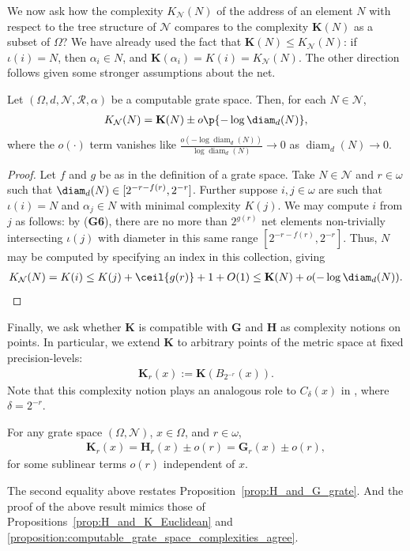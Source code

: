 We now ask how the complexity $K_{\mathcal{N}}(N)$ of the address of an element $N$ with respect to the tree structure of $\mathcal{N}$ compares to the complexity $\mathbf{K}(N)$ as a subset of $\Omega$? We have already used the fact that $\mathbf{K}(N) \leq 
K_{\mathcal{N}}(N)$: if $\iota(i) = N$, then $\alpha_i \in N$, and $\mathbf{K}(\alpha_i) = K(i) = K_{\mathcal{N}}(N)$. The other direction follows given some stronger assumptions about the net.

\begin{proposition}
    \label{proposition:computable_grate_space_complexities_agree}
    Let $(\Omega, d, \mathcal{N}, \mathscr{R}, \alpha)$ be a computable grate space. Then, for each $N \in \mathcal{N}$,
    \begin{align*}
        K_{\mathcal{N}}(N) = \mathbf{K}(N) \pm o\p{-\log \diam_d(N)},
    \end{align*}
    where the $o(\cdot)$ term vanishes like $\frac{o(-\log \operatorname{diam}_d(N))}{\log \operatorname{diam}_d(N)} \to 0$ as $\operatorname{diam}_d(N) \to 0$.
\end{proposition}
\begin{proof}
    Let $f$ and $g$ be as in the definition of a grate space. Take $N \in \mathcal{N}$ and $r \in \omega$ such that $\diam_d(N) \in [2^{-r - f(r)}, 2^{-r}]$. Further suppose $i, j \in \omega$ are such that $\iota(i) = N$ and $\alpha_j \in N$ with minimal complexity $K(j)$. We may compute $i$ from $j$ as follows: by (\textbf{G6}), there are no more than $2^{g(r)}$ net elements non-trivially intersecting $\iota(j)$ with diameter in this same range $[2^{-r - f(r)}, 2^{-r}]$. Thus, $N$ may be computed by specifying an index in this collection, giving
    \begin{align*}
        K_{\mathcal{N}}(N) = K(i) \leq K(j) + \ceil{g(r)} + 1 + O(1) \leq \mathbf{K}(N) + o(-\log \diam_d(N)).
    \end{align*}
\end{proof}

Finally, we ask whether $\mathbf{K}$ is compatible with $\mathbf{G}$ and $\mathbf{H}$ as complexity notions on points. In particular, we extend $\mathbf{K}$ to arbitrary points of the metric space at fixed precision-levels: 
\begin{align*}
    \mathbf{K}_r(x) := \mathbf{K}(B_{2^{-r}}(x)).
\end{align*}
Note that this complexity notion plays an analogous role to $C_\delta(x)$ in \cite{LLM23}, where $\delta = 2^{-r}$. 
\begin{proposition}
    For any grate space $(\Omega, \mathcal{N})$, $x \in \Omega$, and $r \in \omega$,
    \begin{align*}
        \mathbf{K}_r(x) = \mathbf{H}_r(x) \pm o(r) = \mathbf{G}_r(x) \pm o(r),
    \end{align*}
    for some sublinear terms $o(r)$ independent of $x$.
    \label{prop:K_and_H_and_G_grate}
\end{proposition}
The second equality above restates Proposition~\ref{prop:H_and_G_grate}. And the proof of the above result mimics those of Propositions~\ref{prop:H_and_K_Euclidean} and \ref{proposition:computable_grate_space_complexities_agree}. 

